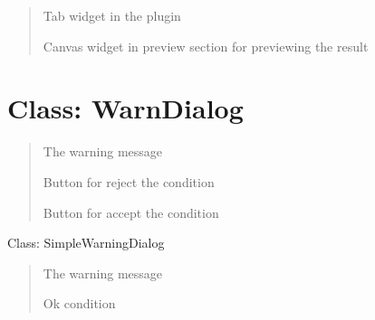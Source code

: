 \documentclass[letterpaper,10pt,english]{sphinxmanual}
\begin{document}
\begin{quote}
\begin{fulllineitems}
\end{fulllineitems}



\begin{fulllineitems}
Tab widget in the plugin

\end{fulllineitems}



\begin{fulllineitems}
Canvas widget in preview section for previewing the result

\end{fulllineitems}

\end{quote}


\section{Class: WarnDialog}
\label{\detokenize{dialog_classes:class-warndialog}}\begin{quote}


\begin{fulllineitems}
The warning message

\end{fulllineitems}



\begin{fulllineitems}
Button for reject the condition

\end{fulllineitems}



\begin{fulllineitems}
Button for accept the condition

\end{fulllineitems}

\end{quote}

Class: SimpleWarningDialog
\begin{quote}


\begin{fulllineitems}
The warning message

\end{fulllineitems}



\begin{fulllineitems}
Ok condition

\end{fulllineitems}

\end{quote}
\end{document}
